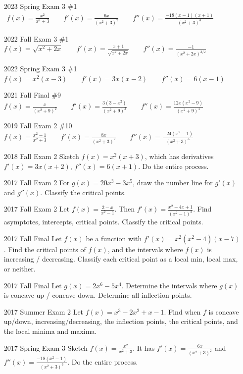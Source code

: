\documentclass[10pt]{scrartcl}
\theoremstyle{definition}
\begin{document}
\begin{enumerate}
\item [2023 Spring Exam 3 \#1]
$\begin{aligned}
    f(x) = \frac{x^2}{x^2+3}
    \qquad
    f'(x) = \frac{6x}{(x^2+3)^2}
    \qquad
    f''(x) = \frac{-18(x-1)(x+1)}{(x^2+3)^3}
  \end{aligned}$
\item [2022 Fall Exam 3 \#1]
  $
    f(x) = \sqrt{x^2+2x}
    \qquad
    f'(x) = \frac{x+1}{\sqrt{x^2+2x}}
    \qquad
    f''(x) = \frac{-1}{(x^2+2x)^{3/2}}
  $
\item [2022 Spring Exam 3 \#1]
  $
    f(x) = x^2(x-3)
    \qquad
    f'(x) = 3x(x-2)
    \qquad
    f''(x) = 6(x-1)
  $
\item [2021 Fall Final \#9]
  $
    f(x) = \frac{x}{(x^2+9)^2}
    \qquad
    f'(x) = \frac{3(3-x^2)}{(x^2+9)^3}
    \qquad
    f''(x) = \frac{12x(x^2-9)}{(x^2+9)^4}
  $
\item [2019 Fall Exam 2 \#10]
  $
    f(x) = \frac{x^2-1}{x^2+3}
    \qquad
    f'(x) = \frac{8x}{(x^2+3)^2}
    \qquad
    f''(x) = \frac{-24(x^2-1)}{(x^2+3)^3}
  $
\item [2018 Fall Exam 2] Sketch $f(x) = x^2(x+3)$, which has derivatives $f'(x) = 3x(x+2)$, $f''(x)=6(x+1)$. Do the entire process.
\item [2017 Fall Exam 2] For $g(x) = 20x^3 - 3x^5$, draw the number line for $g'(x)$ and $g''(x)$. Classify the critical points.
\item [2017 Fall Exam 2] Let $f(x) = \frac{2-x}{x^2 - 1}$. Then $f'(x) = \frac{x^2- 4x+1}{(x^2-1)^2}$. Find asymptotes, intercepts, critical points. Classify the critical points.
\item [2017 Fall Final] Let $f(x)$ be a function with $f'(x) = x^2(x^2-4)(x-7)$. Find the critical points of $f(x)$, and the intervals where $f(x)$ is increasing / decreasing. Classify each critical point as a local min, local max, or neither.
\item [2017 Fall Final] Let $g(x) = 2x^6 - 5x^4$. Determine the intervals where $g(x)$ is concave up / concave down. Determine all inflection points.
\item [2017 Summer Exam 2] Let $f(x) = x^3 - 2x^2 + x - 1$. Find when $f$ is concave up/down, increasing/decreasing, the inflection points, the critical points, and the local minima and maxima.
\item [2017 Spring Exam 3] Sketch $f(x) = \frac{x^2}{x^2 + 3}$. It has $f'(x) = \frac{6x}{(x^2+3)^2}$ and $f''(x) = \frac{-18(x^2-1)}{(x^2+3)^3}$. Do the entire process.

\end{enumerate}
\end{document}
